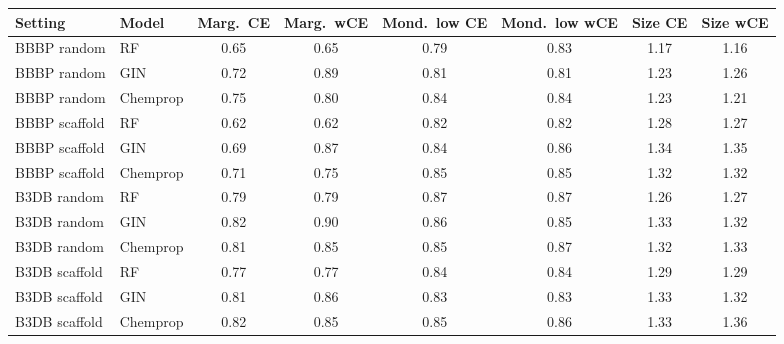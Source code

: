 \begin{tabular}{llcccccc}
\toprule
Setting & Model & Marg.\ CE & Marg.\ wCE & Mond.\ low CE & Mond.\ low wCE & Size CE & Size wCE\\
\midrule
BBBP random & RF & 0.65 & 0.65 & 0.79 & 0.83 & 1.17 & 1.16\\
BBBP random & GIN & 0.72 & 0.89 & 0.81 & 0.81 & 1.23 & 1.26\\
BBBP random & Chemprop & 0.75 & 0.80 & 0.84 & 0.84 & 1.23 & 1.21\\
BBBP scaffold & RF & 0.62 & 0.62 & 0.82 & 0.82 & 1.28 & 1.27\\
BBBP scaffold & GIN & 0.69 & 0.87 & 0.84 & 0.86 & 1.34 & 1.35\\
BBBP scaffold & Chemprop & 0.71 & 0.75 & 0.85 & 0.85 & 1.32 & 1.32\\
B3DB random & RF & 0.79 & 0.79 & 0.87 & 0.87 & 1.26 & 1.27\\
B3DB random & GIN & 0.82 & 0.90 & 0.86 & 0.85 & 1.33 & 1.32\\
B3DB random & Chemprop & 0.81 & 0.85 & 0.85 & 0.87 & 1.32 & 1.33\\
B3DB scaffold & RF & 0.77 & 0.77 & 0.84 & 0.84 & 1.29 & 1.29\\
B3DB scaffold & GIN & 0.81 & 0.86 & 0.83 & 0.83 & 1.33 & 1.32\\
B3DB scaffold & Chemprop & 0.82 & 0.85 & 0.85 & 0.86 & 1.33 & 1.36\\
\bottomrule
\end{tabular}
